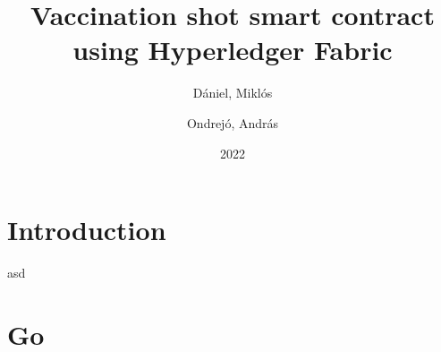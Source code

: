 \documentclass{article}
\author{
  Dániel, Miklós\\
  \IfFileExists{DM.txt}{
    \texttt{
        \begingroup
            \obeylines
            
        \endgroup
            }
  }{}  
  \and
  Ondrejó, András\\
  \IfFileExists{OA.txt}{
    \texttt{
        \begingroup
            \obeylines
            
        \endgroup
            }
  }{}  
}
\title{Vaccination shot smart contract using Hyperledger Fabric}
\date{2022}
\begin{document}
\maketitle
\newpage
\tableofcontents
\newpage
\section{Introduction}
asd
\section{Go}
\end{document}
